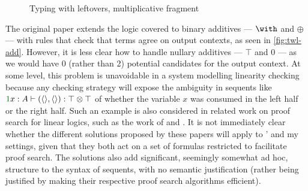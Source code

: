 \begin{figure}
  \caption{Typing with leftovers, multiplicative fragment}
  \label{fig:twl-mult}
\end{figure}

The original paper extends the logic covered to binary additives --- $\with$ and
$\oplus$ --- with rules that check that terms agree on output contexts, as seen
in \cref{fig:twl-add}.
However, it is less clear how to handle nullary additives --- $\top$ and $0$ ---
as we would have 0 (rather than 2) potential candidates for the output context.
At some level, this problem is unavoidable in a system modelling linearity
checking because any checking strategy will expose the ambiguity in sequents
like $\gr1x : A \vdash (\langle\rangle, \langle\rangle) : \top \otimes \top$ of
whether the variable
$x$ was consumed in the left half or the right half.
Such an example is also considered in related work on proof search for linear
logics, such as the work of \citet[p.\ 11]{WH94} and \citet[p.\ 150]{CHP00}.
It is not immediately clear whether the different solutions proposed by these
papers will apply to \citeauthor{allais17}' and my settings, given that they
both act on a set of formulas restricted to facilitate proof search.
The solutions also add significant, seemingly somewhat ad hoc, structure to the
syntax of sequents, with no semantic justification (rather being justified by
making their respective proof search algorithms efficient).

